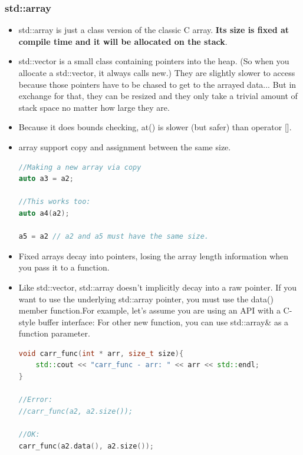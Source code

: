 \documentclass[a4paper,12pt,twoside]{book}
\begin{document}
\subsubsection{std::array}
\begin{itemize}
\item std::array is just a class version of the classic C array. \textbf{Its size is fixed at compile time and it will be allocated  on the stack}.

\item std::vector is a small class containing pointers into the heap. (So when you allocate a std::vector, it always calls new.) They are slightly slower to access because those pointers have to be chased to get to the arrayed data... But in exchange for that, they can be resized and they only take a trivial amount of stack space no matter how large they are.


\item Because it does bounds checking, at() is slower (but safer) than operator [].

\item array support copy and assignment between the same size.
\begin{lstlisting}[frame=single, language=c++]
//Making a new array via copy
auto a3 = a2;

//This works too:
auto a4(a2);

a5 = a2 // a2 and a5 must have the same size.
\end{lstlisting}


\item Fixed arrays decay into pointers, losing the array length information when you pass it to a function.

\item Like std::vector, std::array doesn't implicitly decay into a raw pointer. If you want to use the underlying std::array pointer, you must use the data() member function.For example, let's assume you are using an API with a C-style buffer interface: For other new function, you can use std::array\& as a function parameter. 

\begin{lstlisting}[frame=single, language=c++]
void carr_func(int * arr, size_t size){
    std::cout << "carr_func - arr: " << arr << std::endl;
}

//Error:
//carr_func(a2, a2.size());

//OK:
carr_func(a2.data(), a2.size());
\end{lstlisting}


\end{itemize}
\end{document}
